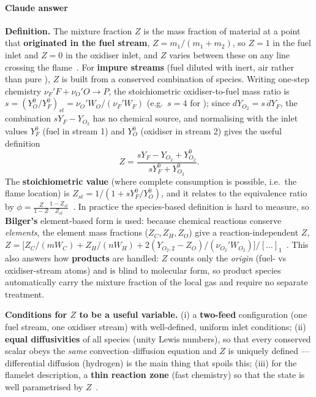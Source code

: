 {\color{istblue}
\paragraph{Claude answer}
\textbf{Definition.} The mixture fraction $Z$ is the mass fraction of material at a point that \textbf{originated in the fuel stream}, $Z = m_1/(m_1+m_2)$, so $Z=1$ in the fuel inlet and $Z=0$ in the oxidiser inlet, and $Z$ varies between these on any line crossing the flame~\cite{lecture9,warnatz2006combustion}. For \textbf{impure streams} (fuel diluted with inert, air rather than pure ), $Z$ is built from a conserved combination of species. Writing one-step chemistry $\nu_F' F + \nu_{O}' O \to P$, the stoichiometric oxidiser-to-fuel mass ratio is $s = (Y_O^0/Y_F^0)_{st} = \nu_O' W_O/(\nu_F' W_F)$ (e.g.\ $s=4$ for ); since $dY_{O_2} = s\,dY_F$, the combination $sY_F - Y_{O_2}$ has no chemical source, and normalising with the inlet values $Y_F^0$ (fuel in stream 1) and $Y_O^0$ (oxidiser in stream 2) gives the useful definition~\cite{lecture9}
\begin{equation*}
Z = \frac{sY_F - Y_{O_2} + Y_{O_2}^0}{sY_F^0 + Y_{O_2}^0}.
\end{equation*}
The \textbf{stoichiometric value} (where complete consumption is possible, i.e.\ the flame location) is $Z_{st} = 1/\!\left(1 + sY_F^0/Y_O^0\right)$, and it relates to the equivalence ratio by $\phi = \tfrac{Z}{1-Z}\tfrac{1-Z_{st}}{Z_{st}}$~\cite{lecture9,poinsot2012theoretical}. In practice the species-based definition is hard to measure, so \textbf{Bilger's} element-based form is used: because chemical reactions conserve \emph{elements}, the element mass fractions ($Z_C,Z_H,Z_O$) give a reaction-independent $Z$, $Z = \big[Z_C/(mW_C)+Z_H/(nW_H)+2(Y_{O_2,2}-Z_O)/(\nu_{O_2}'W_{O_2})\big]/[\dots]_1$~\cite{lecture9,bilger1989structure}. This also answers how \textbf{products} are handled: $Z$ counts only the \emph{origin} (fuel- vs oxidiser-stream atoms) and is blind to molecular form, so product species automatically carry the mixture fraction of the local gas and require no separate treatment.

\textbf{Conditions for $Z$ to be a useful variable.} (i) a \textbf{two-feed} configuration (one fuel stream, one oxidiser stream) with well-defined, uniform inlet conditions; (ii) \textbf{equal diffusivities} of all species (unity Lewis numbers), so that every conserved scalar obeys the \emph{same} convection--diffusion equation and $Z$ is uniquely defined --- differential diffusion (hydrogen) is the main thing that spoils this; (iii) for the flamelet description, a \textbf{thin reaction zone} (fast chemistry) so that the state is well parametrised by $Z$~\cite{lecture9,warnatz2006combustion,peters2000turbulent}.

}
